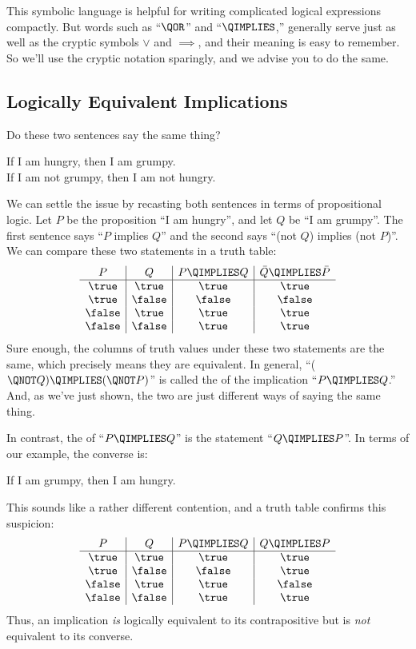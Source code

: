 This symbolic language is helpful for writing complicated logical
expressions compactly.  But words such as ``$\QOR$'' and ``$\QIMPLIES$,''
generally serve just as well as the cryptic symbols $\vee$ and $\implies$,
and their meaning is easy to remember.  So we'll use the cryptic notation
sparingly, and we advise you to do the same.

\subsection{Logically Equivalent Implications}

Do these two sentences say the same thing?
%
\begin{center}
If I am hungry, then I am grumpy. \\
If I am not grumpy, then I am not hungry.
\end{center}
%
We can settle the issue by recasting both sentences in terms of
propositional logic.  Let $P$ be the proposition ``I am hungry'', and
let $Q$ be ``I am grumpy''.  The first sentence says ``$P$ implies
$Q$'' and the second says ``(not $Q$) implies (not $P$)''.  We can
compare these two statements in a truth table:
%
\[
\begin{array}{c|c|c|c}
P & Q &
    P \QIMPLIES Q &
    \bar{Q} \QIMPLIES \bar{P} \\ \hline
\true & \true & \true & \true \\
\true & \false & \false & \false \\
\false & \true & \true & \true \\
\false & \false & \true & \true
\end{array}
\]
%
Sure enough, the columns of truth values under these two statements are
the same, which precisely means they are equivalent.  In general,
``($\QNOT Q) \QIMPLIES (\QNOT P)$'' is called the  of
the implication ``$P \QIMPLIES Q$.''  And, as we've just shown, the two
are just different ways of saying the same thing.

In contrast, the  of ``$P \QIMPLIES Q$'' is the statement
``$Q \QIMPLIES P$''.  In terms of our example, the converse is:
%
\begin{center}
If I am grumpy, then I am hungry.
\end{center}
%
This sounds like a rather different contention, and a truth table
confirms this suspicion:
%
\[
\begin{array}{c|c|c|c}
P & Q &
    P \QIMPLIES Q &
    Q \QIMPLIES P \\ \hline
\true & \true & \true & \true \\
\true & \false & \false & \true \\
\false & \true & \true & \false \\
\false & \false & \true & \true
\end{array}
\]
%
Thus, an implication \textit{is} logically equivalent to its
contrapositive but is \textit{not} equivalent to its converse.


